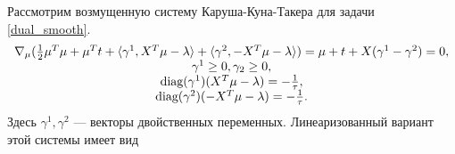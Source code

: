 \documentclass[12pt]{article}
\begin{document}
		Рассмотрим возмущенную систему Каруша-Куна-Такера для задачи \ref{dual_smooth}.
		\begin{equation}\label{KKT}
		\begin{array}[c]{c}
			\nabla_\mu(\frac 1 2 \mu^T \mu + \mu^T t + \langle \gamma^1, X^T \mu - \lambda \rangle + \langle \gamma^2,  - X^T \mu - \lambda  \rangle) = \mu + t + X (\gamma^1 - \gamma^2) = 0, \\
			\gamma^1 \ge 0, \gamma_2 \ge 0, \\
			\mbox{diag}(\gamma^1) (X^T \mu - \lambda) = - \frac 1 \tau,\\
			\mbox{diag}(\gamma^2) (-X^T \mu - \lambda) = - \frac 1 \tau.
		\end{array}
		\end{equation}
		Здесь $\gamma^1, \gamma^2$ — векторы двойственных переменных. Линеаризованный вариант этой системы имеет вид
\end{document}
